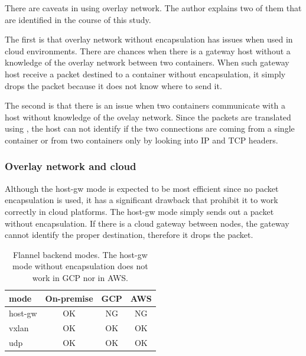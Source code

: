 There are caveats in using overlay network.
The author explains two of them that are identified in the course of this study.


  The first is that overlay network without encapsulation has issues when used in cloud environments.
  There are chances when there is a gateway host without a knowledge of the overlay network between two containers.
  When such gateway host receive a packet destined to a container without encapsulation, it simply drops the packet because it does not know where to send it.

  The second is that there is an issue when two containers communicate with a host without knowledge of the ovelay network.
  Since the packets are translated using , the host can not identify if the two connections are coming from a single container or from two containers only by looking into IP and TCP headers.


\subsubsection{Overlay network and cloud}

Although the host-gw mode is expected to be most efficient since no packet encapsulation is used, it has a significant drawback that prohibit it to work correctly in cloud platforms. 
The host-gw mode simply sends out a packet without encapsulation.
If there is a cloud gateway between nodes, the gateway cannot identify the proper destination, therefore it drops the packet.

\begin{table}
  \centering
  \begin{tabular}{lccc}
    \toprule
    mode & On-premise & GCP & AWS \\
    \midrule
    host-gw & OK & NG & NG \\
    vxlan & OK & OK & OK \\
    udp & OK & OK & OK \\
    \bottomrule
  \end{tabular}

  \par\bigskip
  \centering
  \begin{minipage}{0.9\columnwidth}
    \caption[Flannel backend modes]{
      Flannel backend modes.
      The host-gw mode without encapsulation does not work in GCP nor in AWS.
    }
    \label{tab:Viable flannel backends}
  \end{minipage}
\end{table}

